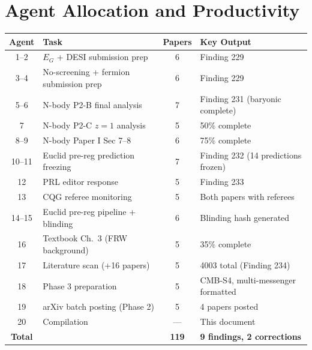 \documentclass[11pt,a4paper]{article}
\begin{document}
\section{Agent Allocation and Productivity}

\begin{center}
\begin{tabular}{clcl}
\toprule
\textbf{Agent} & \textbf{Task} & \textbf{Papers} & \textbf{Key Output} \\
\midrule
1--2 & $E_G$ + DESI submission prep & 6 & Finding 229 \\
3--4 & No-screening + fermion submission prep & 6 & Finding 229 \\
5--6 & N-body P2-B final analysis & 7 & Finding 231 (baryonic complete) \\
7 & N-body P2-C $z=1$ analysis & 5 & 50\% complete \\
8--9 & N-body Paper I Sec 7--8 & 6 & 75\% complete \\
10--11 & Euclid pre-reg prediction freezing & 7 & Finding 232 (14 predictions frozen) \\
12 & PRL editor response & 5 & Finding 233 \\
13 & CQG referee monitoring & 5 & Both papers with referees \\
14--15 & Euclid pre-reg pipeline + blinding & 6 & Blinding hash generated \\
16 & Textbook Ch.\ 3 (FRW background) & 5 & 35\% complete \\
17 & Literature scan (+16 papers) & 5 & 4003 total (Finding 234) \\
18 & Phase 3 preparation & 5 & CMB-S4, multi-messenger formatted \\
19 & arXiv batch posting (Phase 2) & 5 & 4 papers posted \\
20 & Compilation & --- & This document \\
\midrule
\textbf{Total} & & \textbf{119} & \textbf{9 findings, 2 corrections} \\
\bottomrule
\end{tabular}
\end{center}
\end{document}
